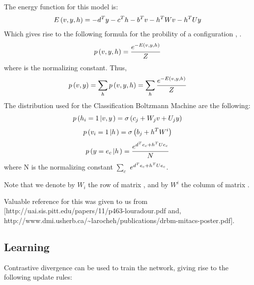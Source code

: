 The energy function for this model is:
\[ E \left( v , y, h \right) = - d^T y - c^T h - b^T v - h^T W v - h^T
   U y \]
Which gives rise to the following formula for the probility of a configuration
, .
\[ p \left( v, y, h \right) = \frac{e^{- E \left( v , y, h
   \right)}}{Z} \]
where  is the normalizing constant. Thus,
\[ p \left( v, y \right) = \sum_h p \left( v, y, h \right) = \sum_h \frac{e^{-
   E \left( v , y, h \right)}}{Z} \]
The distribution used for the Classification Boltzmann Machine are the
following:
\begin{equation}
  p \left( h_i = 1 \left| v, y \right. \right) = \sigma \left( c_j + 
   W_j v  + U_j y \right)
\end{equation}
\begin{equation}
  p \left( v_i = 1 \left| h \right. \right) = \sigma \left( b_j + 
   h^T W^i  \right)
\end{equation}
\begin{equation}
  p \left( y = e_c \left| h \right. \right) = \frac{e^{d^T e_c  + h^T
  Ue_c}}{N}
\end{equation}
where N is the normalizing constant $\sum_c$ $e^{d^T e_c  + h^T Ue_c}$.

Note that we denote by $W_i$ the row  of matrix , and
by $W^i_{}$ the column  of matrix .



Valuable reference for this was given to us from
[http://uai.sis.pitt.edu/papers/11/p463-louradour.pdf and,
http://www.dmi.usherb.ca/\~{ }larocheh/publications/drbm-mitacs-poster.pdf].

\subsection{Learning}

Contrastive divergence can be used to train the network, giving rise to the
following update rules:


